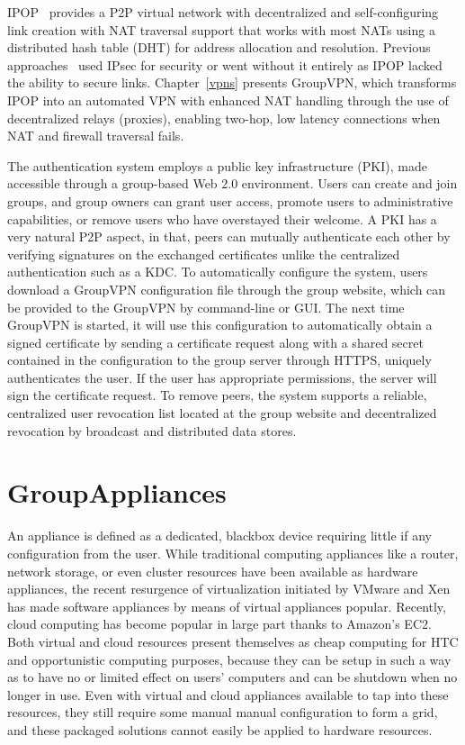 IPOP~\cite{ipop} provides a P2P virtual network with decentralized and
self-configuring link creation with NAT traversal support that works with
most NATs using a distributed hash table (DHT) for address
allocation and resolution.  Previous approaches~\cite{grid_appliance} used
IPsec for security or went without it entirely as IPOP lacked the ability to
secure links.  Chapter~\ref{vpns} presents GroupVPN, which transforms IPOP
into an automated VPN with enhanced NAT handling through the use of
decentralized relays (proxies), enabling two-hop, low latency connections when
NAT and firewall traversal fails.

The authentication system employs a public key infrastructure (PKI), made
accessible through a group-based Web 2.0 environment.  Users can create and
join groups, and group owners can grant user access, promote users to
administrative capabilities, or remove users who have overstayed their
welcome.  A PKI has a very natural P2P aspect, in that, peers can mutually
authenticate each other by verifying signatures on the exchanged certificates
unlike the centralized authentication such as a KDC.  To automatically configure
the system, users download a GroupVPN configuration file through the group
website, which can be provided to the GroupVPN by command-line or GUI.  The
next time GroupVPN is started, it will use this configuration to automatically
obtain a signed certificate by sending a certificate request along with a
shared secret contained in the configuration to the group server through HTTPS,
uniquely authenticates the user.  If the user has appropriate permissions, the
server will sign the certificate request.  To remove peers, the system supports
a reliable, centralized user revocation list located at the group website and
decentralized revocation by broadcast and distributed data stores.

\section{GroupAppliances}
An appliance is defined as a dedicated, blackbox device requiring little if any
configuration from the user.  While traditional computing appliances like a
router, network storage, or even cluster resources have been available as
hardware appliances, the recent resurgence of virtualization initiated by
VMware and Xen has made software appliances by means of virtual appliances
popular.  Recently, cloud computing has become popular in large part thanks to
Amazon's EC2.  Both virtual and cloud resources present themselves as cheap
computing for HTC and opportunistic computing purposes, because they can be
setup in such a way as to have no or limited effect on users' computers and can
be shutdown when no longer in use.  Even with virtual and cloud appliances 
available to tap into these resources, they still require some manual
manual configuration to form a grid, and these packaged solutions cannot easily
be applied to hardware resources.

